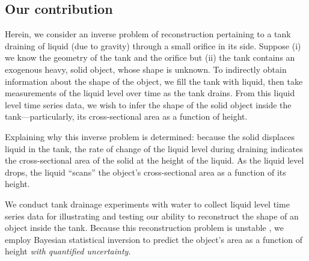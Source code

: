 \documentclass[openacc]{rsproca_new}%
\begin{document}
\subsection{Our contribution}
Herein, we consider an inverse problem of reconstruction pertaining to a tank draining of liquid (due to gravity) through a small orifice in its side.
Suppose (i) we know the geometry of the tank and the orifice but (ii) the tank contains an exogenous heavy, solid object, whose shape is unknown.
To indirectly obtain information about the shape of the object, we fill the tank with liquid, then take measurements of the liquid level over time as the tank drains.
From this liquid level time series data, we wish
to infer the shape of the solid object inside the tank---particularly, its cross-sectional area as a function of height.

Explaining why this inverse problem is determined:
because the solid displaces liquid in the tank, the rate of change of the liquid level during draining indicates the cross-sectional area of the solid at the height of the liquid.
As the liquid level drops, the liquid ``scans'' the object's cross-sectional area as a function of its height. 

We conduct tank drainage experiments with water to collect liquid level time series data for illustrating and testing our ability to reconstruct the shape of an object inside the tank.
Because this reconstruction problem is unstable \cite{groetsch1993inverse}, we employ Bayesian statistical inversion \cite{calvetti2018inverse,waqar2023tutorial,kaipio2006statistical,dashti2013bayesian} to predict the object's area as a function of height \emph{with quantified uncertainty}.

\end{document}
